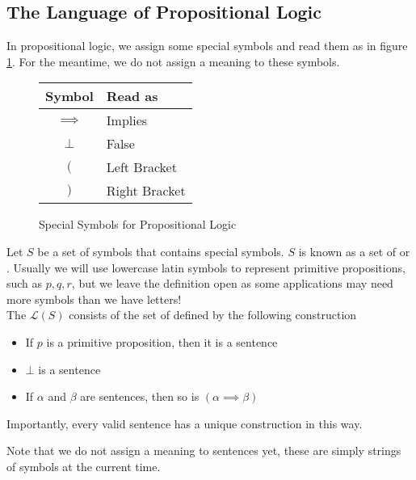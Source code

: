 \documentclass[11pt]{article}
\begin{document}
\subsection{The Language of Propositional Logic}
In propositional logic, we assign some special symbols and read them as in figure \ref{fig:specialSymbolsProp}. For the meantime, we do not assign a meaning to these symbols.
\begin{figure}[H]
    \caption{Special Symbols for Propositional Logic}
    \label{fig:specialSymbolsProp}
    \centering
    \begin{tabular}{|c|l|}
        \hline
        Symbol & Read as \\ \hline \hline
        $\implies$ & Implies \\ \hline
        $\bot$ & False \\ \hline
        $($ & Left Bracket \\ \hline
        $)$ & Right Bracket \\ \hline
    \end{tabular}
\end{figure}
\begin{defi}
    Let $S$ be a set of symbols that contains special symbols. $S$ is known as a set of  or . Usually we will use lowercase latin symbols to represent primitive propositions, such as $p,q,r$, but we leave the definition open as some applications may need more symbols than we have letters!\\ The  $\mathcal{L}(S)$ consists of the set of  defined by the following construction
    \begin{itemize}
        \item If $p$ is a primitive proposition, then it is a sentence
        \item $\bot$ is a sentence
        \item If $\alpha$ and $\beta$ are sentences, then so is $(\alpha \implies \beta)$
    \end{itemize}
    Importantly, every valid sentence has a unique construction in this way.
\end{defi}
Note that we do not assign a meaning to sentences yet, these are simply strings of symbols at the current time. 

\pagebreak
\end{document}
